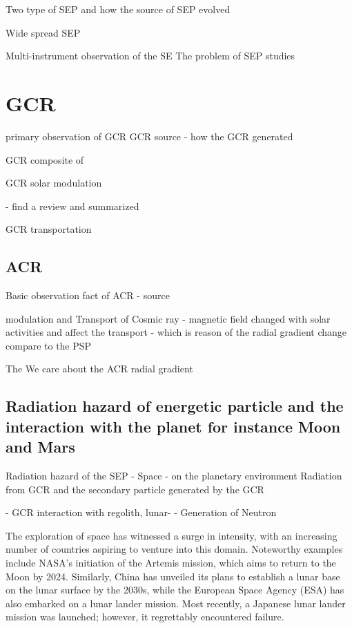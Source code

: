 Two type of SEP and how the source of SEP evolved

Wide spread SEP

Multi-instrument observation of the SE
The problem of SEP studies



\section{GCR}

primary observation of GCR
	GCR source  - how the GCR generated

	GCR composite of 

GCR solar modulation

 - find a review and summarized

 GCR transportation






\subsection{ACR}

Basic observation fact of ACR
- source 

modulation and Transport of Cosmic ray - magnetic field changed with solar activities and affect the transport -  which is reason of the radial gradient change compare to the PSP 

The 
We care about the ACR radial gradient



\subsection{Radiation hazard of energetic particle and the interaction with the planet for instance Moon and Mars}

Radiation hazard of the SEP 
- Space
- on the planetary environment
Radiation from GCR and the secondary particle generated by the GCR

- GCR interaction with regolith, lunar-
	- Generation of Neutron

The exploration of space has witnessed a surge in intensity, with an increasing number of countries aspiring to venture into this domain. Noteworthy examples include NASA's initiation of the Artemis mission, which aims to return to the Moon by 2024. Similarly, China has unveiled its plans to establish a lunar base on the lunar surface by the 2030s, while the European Space Agency (ESA) has also embarked on a lunar lander mission. Most recently, a Japanese lunar lander mission was launched; however, it regrettably encountered failure.

